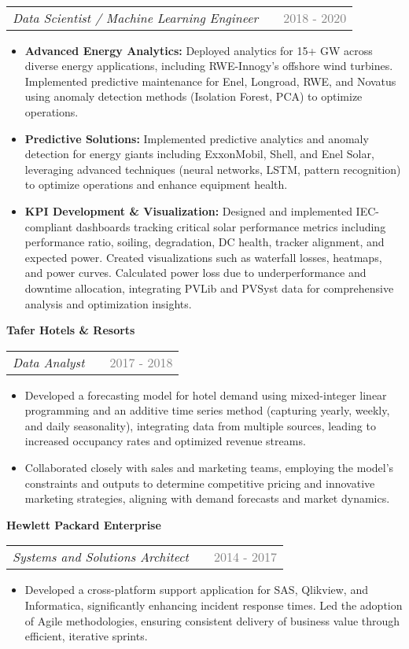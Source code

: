 \documentclass[a4paper,12pt]{article}
\makeatletter
\newenvironment{joblong}[3]
    {
    \noindent\textbf{\large #1}\\ %
    \begin{tabularx}{\linewidth}{@{}l X r@{}}
    \textit{#2} & &  {\textcolor{gray}{#3}} \\[3.75pt] %
    \end{tabularx}
    \begin{minipage}[t]{\linewidth}
    \begin{itemize}[nosep,after=\strut, leftmargin=1em, itemsep=3pt,label=--]
    }
    {
    \end{itemize}
    \end{minipage}    
    }
\makeatother
\begin{document}
\begin{joblong}{}{Data Scientist / Machine Learning Engineer}{2018 - 2020}
    \item \textbf{Advanced Energy Analytics:} Deployed analytics for 15+ GW across diverse energy applications, including RWE-Innogy's offshore wind turbines. Implemented predictive maintenance for Enel, Longroad, RWE, and Novatus using anomaly detection methods (Isolation Forest, PCA) to optimize operations.
    \item \textbf{Predictive Solutions:} Implemented predictive analytics and anomaly detection for energy giants including ExxonMobil, Shell, and Enel Solar, leveraging advanced techniques (neural networks, LSTM, pattern recognition) to optimize operations and enhance equipment health.
    \item \textbf{KPI Development \& Visualization:} Designed and implemented IEC-compliant dashboards tracking critical solar performance metrics including performance ratio, soiling, degradation, DC health, tracker alignment, and expected power. Created visualizations such as waterfall losses, heatmaps, and power curves. Calculated power loss due to underperformance and downtime allocation, integrating PVLib and PVSyst data for comprehensive analysis and optimization insights.
\end{joblong}

\begin{joblong}{Tafer Hotels \&  Resorts }{Data Analyst}{2017 - 2018}
    \item Developed a forecasting model for hotel demand using mixed-integer linear programming and an additive time series method (capturing yearly, weekly, and daily seasonality), integrating data from multiple sources, leading to increased occupancy rates and optimized revenue streams.
    \item Collaborated closely with sales and marketing teams, employing the model's constraints and outputs to determine competitive pricing and innovative marketing strategies, aligning with demand forecasts and market dynamics.
\end{joblong}

\begin{joblong}{Hewlett Packard Enterprise}{Systems and Solutions Architect}{2014 - 2017}
    \item Developed a cross-platform support application for SAS, Qlikview, and Informatica, significantly enhancing incident response times. Led the adoption of Agile methodologies, ensuring consistent delivery of business value through efficient, iterative sprints.
\end{joblong}
    
\end{document}
